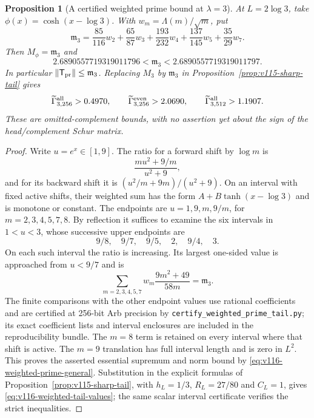 \documentclass[11pt]{article}
\newtheorem{proposition}[theorem]{Proposition}
\theoremstyle{remark}
\newcommand{\norm}[1]{\left\lVert #1\right\rVert}
\begin{document}
\begin{proposition}[A certified weighted prime bound at $\lambda=3$]
\label{prop:v116-weighted-prime}
At $L=2\log3$, take $\phi(x)=\cosh(x-\log3)$. With
$w_m=\Lambda(m)/\sqrt m$, put
\begin{equation}\label{eq:v116-prime-constant}
 \mathfrak m_3=
 \frac{85}{116}w_2+\frac{65}{87}w_3+
 \frac{193}{232}w_4+\frac{137}{145}w_5+
 \frac{35}{29}w_7.
\end{equation}
Then $M_\phi=\mathfrak m_3$ and
\[
 2.6890557719319011796<\mathfrak m_3
       <2.6890557719319011797.
\]
In particular $\norm{\mathsf T_{\rm pr}}\le\mathfrak m_3$.
Replacing $M_3$ by $\mathfrak m_3$ in
Proposition~\ref{prop:v115-sharp-tail} gives
\begin{equation}\label{eq:v116-weighted-tail-values}
 \widetilde\Gamma_{3,256}^{\rm all}>0.4970,
 \qquad \widetilde\Gamma_{3,256}^{\rm even}>2.0690,
 \qquad \widetilde\Gamma_{3,512}^{\rm all}>1.1907.
\end{equation}
These are omitted-complement bounds, with no assertion yet about the
sign of the head/complement Schur matrix.
\end{proposition}
\begin{proof}
Write $u=e^x\in[1,9]$. The ratio for a forward shift by $\log m$ is
\[
 \frac{m u^2+9/m}{u^2+9},
\]
and for its backward shift it is $(u^2/m+9m)/(u^2+9)$.
On an interval with fixed active shifts, their weighted sum has the
form $A+B\tanh(x-\log3)$ and is monotone or constant. The endpoints
are $u=1,9,m,9/m$, for $m=2,3,4,5,7,8$.
By reflection it suffices to examine the six intervals in $1<u<3$,
whose successive upper endpoints are
\[
 9/8,\quad9/7,\quad9/5,\quad2,\quad9/4,\quad3.
\]
On each such interval the ratio is increasing. Its largest one-sided
value is approached from $u<9/7$ and is
\[
 \sum_{m=2,3,4,5,7}
       w_m\frac{9m^2+49}{58m}=\mathfrak m_3.
\]
The finite comparisons with the other endpoint values use rational
coefficients and are certified at 256-bit Arb precision by
\texttt{certify\_weighted\_prime\_tail.py}; its exact coefficient lists
and interval enclosures are included in the reproducibility bundle.
The $m=8$ term is retained on every interval where that shift is active.
The $m=9$ translation has full interval length and is zero in $L^2$.
This proves the asserted essential supremum and norm bound by
\eqref{eq:v116-weighted-prime-general}. Substitution in the explicit
formulas of Proposition~\ref{prop:v115-sharp-tail}, with
$h_L=1/3$, $R_L=27/80$ and $C_L=1$, gives
\eqref{eq:v116-weighted-tail-values}; the same scalar interval
certificate verifies the strict inequalities.
\end{proof}
\end{document}
